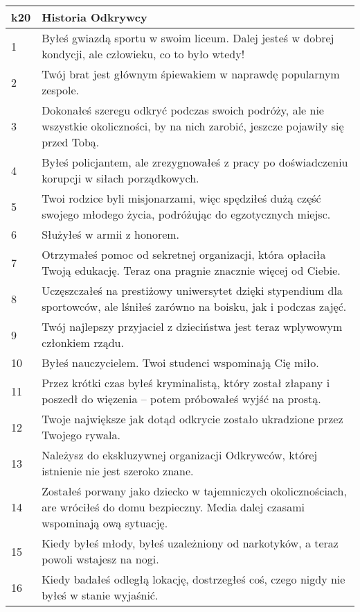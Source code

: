  \begin{table*}[t]
 \centering
 \begin{tabularx}{\textwidth}{| p{} | X |}
  \hline
  \textbf{k20} & \textbf{Historia Odkrywcy}  \\ \hline
    1 & Byłeś gwiazdą sportu w swoim liceum. Dalej jesteś w dobrej kondycji, ale człowieku, co to było wtedy! \\ \hline
    2 & Twój brat jest głównym śpiewakiem w naprawdę popularnym zespole. \\ \hline
    3 & Dokonałeś szeregu odkryć podczas swoich podróży, ale nie wszystkie okoliczności, by na nich zarobić, jeszcze pojawiły się przed Tobą. \\ \hline
    4 & Byłeś policjantem, ale zrezygnowałeś z pracy po doświadczeniu korupcji w siłach porządkowych. \\ \hline
    5 & Twoi rodzice byli misjonarzami, więc spędziłeś dużą część swojego młodego życia, podróżując do egzotycznych miejsc.  \\ \hline
    6 & Służyłeś w armii z honorem. \\ \hline
    7 & Otrzymałeś pomoc od sekretnej organizacji, która opłaciła Twoją edukację. Teraz ona pragnie znacznie więcej od Ciebie.  \\ \hline
    8 & Uczęszczałeś na prestiżowy uniwersytet dzięki stypendium dla sportowców, ale lśniłeś zarówno na boisku, jak i podczas zajęć.  \\ \hline
    9 & Twój najlepszy przyjaciel z dzieciństwa jest teraz wplywowym członkiem rządu. \\ \hline
    10 & Byłeś nauczycielem. Twoi studenci wspominają Cię miło. \\ \hline
    11 & Przez krótki czas byłeś kryminalistą, który został złapany i poszedł do więzenia – potem próbowałeś wyjść na prostą. \\ \hline
    12 & Twoje największe jak dotąd odkrycie zostało ukradzione przez Twojego rywala.  \\ \hline
    13 & Należysz do ekskluzywnej organizacji Odkrywców, której istnienie nie jest szeroko znane. \\ \hline
    14 & Zostałeś porwany jako dziecko w tajemniczych okolicznościach, are wróciłeś do domu bezpieczny. Media dalej czasami wspominają ową sytuację.  \\ \hline
    15 & Kiedy byłeś młody, byłeś uzależniony od narkotyków, a teraz powoli wstajesz na nogi. \\ \hline
    16 & Kiedy badałeś odległą lokację, dostrzegłeś coś, czego nigdy nie byłeś w stanie wyjaśnić. \\ \hline

\end{tabularx}
\end{table*}
